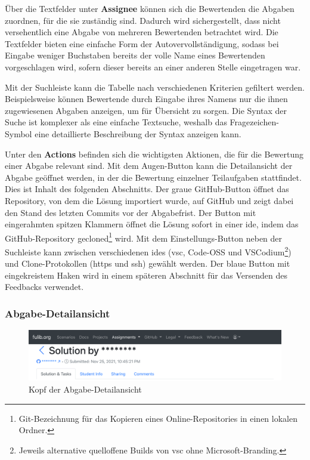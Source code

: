 Über die Textfelder unter \textbf{Assignee} können sich die Bewertenden die Abgaben zuordnen, für die sie zuständig sind.
Dadurch wird sichergestellt, dass nicht versehentlich eine Abgabe von mehreren Bewertenden betrachtet wird.
Die Textfelder bieten eine einfache Form der Autovervollständigung, sodass bei Eingabe weniger Buchstaben bereits der volle Name eines Bewertenden vorgeschlagen wird, sofern dieser bereits an einer anderen Stelle eingetragen war.

Mit der Suchleiste kann die Tabelle nach verschiedenen Kriterien gefiltert werden.
Beispielsweise können Bewertende durch Eingabe ihres Namens nur die ihnen zugewiesenen Abgaben anzeigen, um für Übersicht zu sorgen.
Die Syntax der Suche ist komplexer als eine einfache Textsuche, weshalb das Fragezeichen-Symbol eine detaillierte Beschreibung der Syntax anzeigen kann.

Unter den \textbf{Actions} befinden sich die wichtigsten Aktionen, die für die Bewertung einer Abgabe relevant sind.
Mit dem Augen-Button kann die Detailansicht der Abgabe geöffnet werden, in der die Bewertung einzelner Teilaufgaben stattfindet.
Dies ist Inhalt des folgenden Abschnitts.
Der graue GitHub-Button öffnet das Repository, von dem die Lösung importiert wurde, auf GitHub und zeigt dabei den Stand des letzten Commits vor der Abgabefrist.
Der Button mit eingerahmten spitzen Klammern öffnet die Lösung sofort in einer \ac{ide}, indem das GitHub-Repository gecloned\footnote{
    Git-Bezeichnung für das Kopieren eines Online-Repositories in einen lokalen Ordner.
} wird.
Mit dem Einstellungs-Button neben der Suchleiste kann zwischen verschiedenen \acp{ide} (\ac{vsc}, Code-OSS und VSCodium\footnote{
    Jeweils alternative quelloffene Builds von \ac{vsc} ohne Microsoft-Branding.
}) und Clone-Protokollen (https und ssh) gewählt werden.
Der blaue Button mit eingekreistem Haken wird in einem späteren Abschnitt für das Versenden des Feedbacks verwendet.

\subsubsection{Abgabe-Detailansicht}

\begin{figure}
    \centering
    \includegraphics[width=\textwidth]{images/solution-head}
    \caption{Kopf der Abgabe-Detailansicht}
    \label{fig:solution-head}
\end{figure}



